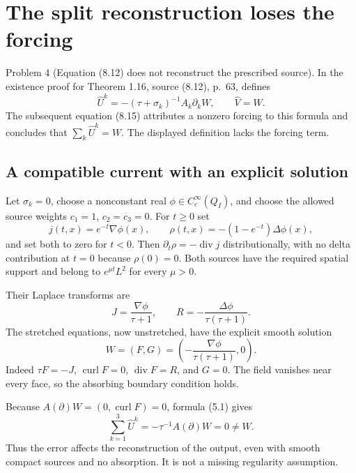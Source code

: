 \documentclass[10pt]{article}
\begin{document}
\section*{The split reconstruction loses the forcing}
Problem 4 (Equation (8.12) does not reconstruct the prescribed source).  In the existence proof for Theorem 1.16, source (8.12), p. 63, defines \[\widehat U^k=-(\tau+\sigma_k)^{-1}A_k\partial_kW,
 \qquad \widehat V=W.
 \tag{5.1}\] The subsequent equation (8.15) attributes a nonzero forcing to this formula and concludes that \(\sum_k\widehat U^k=W\). The displayed definition lacks the forcing term.\par
\subsection*{A compatible current with an explicit solution}
Let \(\sigma_k=0\), choose a nonconstant real \(\phi\in C^\infty_c(Q_I)\), and choose the allowed source weights \(c_1=1\), \(c_2=c_3=0\). For \(t\ge0\) set \[j(t,x)=e^{-t}\nabla\phi(x),\qquad
 \rho(t,x)=-(1-e^{-t})\Delta\phi(x),\] and set both to zero for \(t<0\). Then \(\partial_t\rho=-\operatorname{div}j\) distributionally, with no delta contribution at \(t=0\) because \(\rho(0)=0\). Both sources have the required spatial support and belong to \(e^{\mu t}L^2\) for every \(\mu>0\).\par
Their Laplace transforms are \[J=\frac{\nabla\phi}{\tau+1},\qquad
 R=-\frac{\Delta\phi}{\tau(\tau+1)}.\] The stretched equations, now unstretched, have the explicit smooth solution \[W=(F,G)=\left(-\frac{\nabla\phi}{\tau(\tau+1)},0\right).
 \tag{5.2}\] Indeed \(\tau F=-J\), \(\operatorname{curl}F=0\), \(\operatorname{div}F=R\), and \(G=0\). The field vanishes near every face, so the absorbing boundary condition holds.\par
Because \(A(\partial)W=(0,\operatorname{curl}F)=0\), formula (5.1) gives \[\sum_{k=1}^3\widehat U^k
       =-\tau^{-1}A(\partial)W=0\ne W.
 \tag{5.3}\] Thus the error affects the reconstruction of the output, even with smooth compact sources and no absorption. It is not a missing regularity assumption.\par
\end{document}
